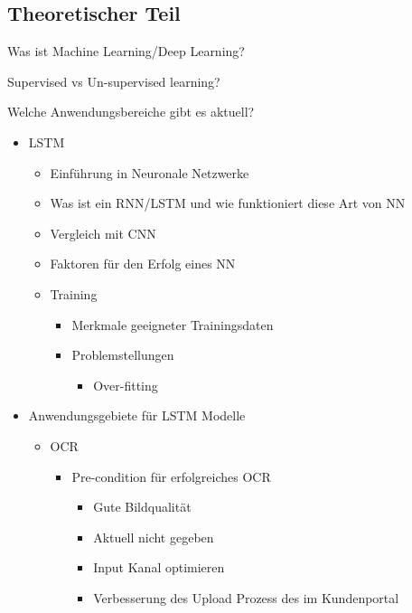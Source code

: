 \documentclass[12pt, twoside, table]{extarticle}
\begin{document}
	
\subsection{Theoretischer Teil}
Was ist Machine Learning/Deep Learning?

Supervised vs Un-supervised learning?

Welche Anwendungsbereiche gibt es aktuell?

\begin{itemize}
    \item LSTM
    \begin{itemize}
        \item Einführung in Neuronale Netzwerke
        \item Was ist ein RNN/LSTM und wie funktioniert diese Art von NN
        \item Vergleich mit CNN
        \item Faktoren für den Erfolg eines NN
        \item Training
        \begin{itemize}
            \item Merkmale geeigneter Trainingsdaten
            \item Problemstellungen
            \begin{itemize}
                \item Over-fitting
            \end{itemize}
        \end{itemize}
        \end{itemize}
		\item Anwendungsgebiete für LSTM Modelle
        \begin{itemize}
	        \item OCR
            \begin{itemize}
			    \item Pre-condition für erfolgreiches OCR
                \begin{itemize}
				    \item Gute Bildqualität
					    \item Aktuell nicht gegeben
						\item Input Kanal optimieren
							\item Verbesserung des Upload Prozess des im Kundenportal

\end{itemize}
\end{itemize}
\end{itemize}
\end{itemize}
\end{document}
